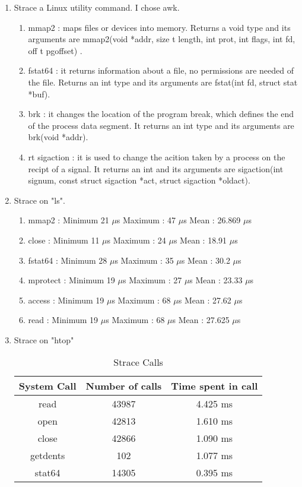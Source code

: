 \documentclass[a4paper]{article}
\begin{document}
\begin {enumerate}
\begin {enumerate}
		\end{enumerate}
	\item Strace a Linux utility command. I chose awk.
		\begin {enumerate}
		\item mmap2 : maps files or devices into memory. Returns a void type and its arguments are mmap2(void *addr, size t length, int prot, int flags, int fd, off t pgoffset) . 
        \item fstat64 : it returns information about a file, no permissions are needed of the file. Returns an int type and its arguments are fstat(int fd, struct stat *buf).
        \item brk : it changes the location of the program break, which defines the end of the process data segment. It returns an int type and its arguments are brk(void *addr).
        \item rt sigaction : it is used to change the acition taken by a process on the recipt of a signal. It returns an int and its arguments are sigaction(int signum, const struct sigaction *act, struct sigaction *oldact).
        \end {enumerate}
	\item Strace on "ls".
		\begin {enumerate}
		\item mmap2 : Minimum 21 $\mu$s Maximum : 47 $\mu$s Mean : 26.869 $\mu$s
		\item close : Minimum 11 $\mu$s Maximum : 24 $\mu$s Mean : 18.91  $\mu$s
		\item fstat64 : Minimum 28 $\mu$s Maximum : 35 $\mu$s Mean : 30.2  $\mu$s
		\item mprotect : Minimum 19 $\mu$s Maximum : 27 $\mu$s Mean : 23.33  $\mu$s
		\item access : Minimum 19 $\mu$s Maximum : 68 $\mu$s Mean : 27.62  $\mu$s
		\item read : Minimum 19 $\mu$s Maximum : 68 $\mu$s Mean : 27.625  $\mu$s
		\end {enumerate}
	\item Strace on "htop"
		 \begin{table}[ht]
		\caption{Strace Calls} %
		\centering %
		\begin{tabular}{c c c} %
		\hline\hline %
		System Call & Number of calls & Time spent in call  \\ [0.5ex] %
		\hline %
		read & 43987 & 4.425 ms\\ %
		open & 42813 & 1.610 ms\\
		close & 42866 & 1.090 ms\\
		getdents & 102 & 1.077 ms\\
		stat64 & 14305 & 0.395 ms\\ [1ex] %
		\hline %
		\end{tabular}
		\label{table:nonlin} %
		\end{table}
\end {enumerate}
\end{document}
